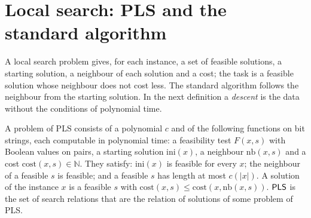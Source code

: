 \section{Local search: PLS and the standard algorithm}
\label{sec:search-pls}

A local search problem gives, for each instance, a set of feasible solutions, a starting solution,
a neighbour of each solution and a cost; the task is a feasible solution whose neighbour does not
cost less. The standard algorithm follows the neighbour from the starting solution. In the next
definition a \emph{descent} is the data without the conditions of polynomial time.

\begin{definition}
  \label{def:search-pls}
  \leanok
  A problem of PLS consists of a polynomial $c$ and of the following functions on bit strings, each
  computable in polynomial time: a feasibility test $F(x, s)$ with Boolean values on pairs, a
  starting solution $\mathrm{ini}(x)$, a neighbour $\mathrm{nb}(x, s)$ and a cost
  $\mathrm{cost}(x, s) \in \mathbb{N}$. They satisfy: $\mathrm{ini}(x)$ is feasible for every $x$;
  the neighbour of a feasible $s$ is feasible; and a feasible $s$ has length at most $c(|x|)$. A
  solution of the instance $x$ is a feasible $s$ with
  $\mathrm{cost}(x, s) \le \mathrm{cost}(x, \mathrm{nb}(x, s))$. $\mathsf{PLS}$ is the set of search
  relations that are the relation of solutions of some problem of PLS.
\end{definition}

